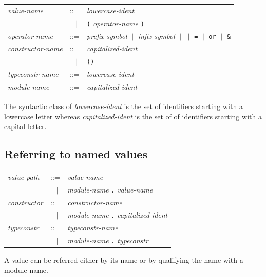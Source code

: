 \documentclass[11pt,titlepage,twoside]{report}
\newcommand{\alt}{\;|\;}
\newcommand{\term}[1]{{\tt #1}}
\newcommand{\nterm}[1]{{\em #1}}
\begin{document}
\begin{center}
\begin{tabular}{lcl}
\nterm{value-name}       & ::=    & \nterm{lowercase-ident} \\
                         & $\;\;\alt$ & \term{(} \nterm{operator-name}
                                        \term{)} \\
\nterm{operator-name}    & ::=    & \nterm{prefix-symbol} 
                           $\alt$   \nterm{infix-symbol} 
                           $\alt$   \term{*} $\alt$ \term{=} $\alt$ \term{or}
                           $\alt$   \term{\&} \\
\nterm{constructor-name} & ::=    & \nterm{capitalized-ident} \\
                         & $\;\;\alt$ & \term{()} \\
\nterm{typeconstr-name}  & ::=    & \nterm{lowercase-ident} \\
\nterm{module-name}      & ::=    & \nterm{capitalized-ident}
\end{tabular}
\end{center}

The syntactic class of \nterm{lowercase-ident} is the
set of identifiers starting with a lowercase letter whereas
\nterm{capitalized-ident} is the set of of identifiers starting with a
capital letter.

\subsection{Referring to named values}
\begin{center}
\begin{tabular}{lcl}
\nterm{value-path}  & ::=        & \nterm{value-name} \\
                    & $\;\;\alt$ & \nterm{module-name} \term{.}
                                   \nterm{value-name} \\
\nterm{constructor} & ::=        & \nterm{constructor-name} \\
                    & $\;\;\alt$ & \nterm{module-name} \term{.}
                                   \nterm{capitalized-ident} \\
\nterm{typeconstr}  & ::=        & \nterm{typeconstr-name} \\
                    & $\;\;\alt$ & \nterm{module-name} \term{.} 
                                   \nterm{typeconstr}
\end{tabular}
\end{center}
A value can be referred either by its name or by qualifying the name
with a module name.
\end{document}
